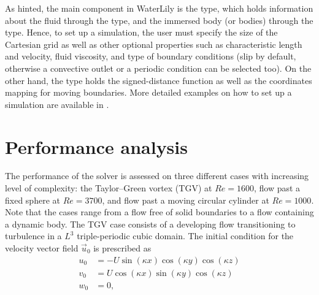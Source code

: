 \documentclass[10pt,a4paper]{article}
\begin{document}
As hinted, the main component in WaterLily is the  type, which holds information about the fluid through the  type, and the immersed body (or bodies) through the  type. Hence, to set up a simulation, the user must specify the size of the Cartesian grid as well as other optional properties such as characteristic length and velocity, fluid viscosity, and type of boundary conditions (slip by default, otherwise a convective outlet or a periodic condition can be selected too). On the other hand, the  type holds the signed-distance function as well as the coordinates mapping for moving boundaries. More detailed examples on how to set up a simulation are available in .

\section{Performance analysis} \label{sec:performance}
The performance of the solver is assessed on three different cases with increasing level of complexity: the Taylor--Green vortex (TGV) at $Re=1600$, flow past a fixed sphere at $Re=3700$, and flow past a moving circular cylinder at $Re=1000$. Note that the cases range from a flow free of solid boundaries to a flow containing a dynamic body. The TGV case consists of a developing flow transitioning to turbulence in a $L^3$ triple-periodic cubic domain. The initial condition for the velocity vector field $\vec{u}_0$ is prescribed as
\begin{align}
u_0 &= -U\sin(\kappa x)\cos(\kappa y)\cos(\kappa z) \\
v_0 &= U\cos(\kappa x)\sin(\kappa y)\cos(\kappa z) \\
w_0 &= 0,
\end{align}
\end{document}
